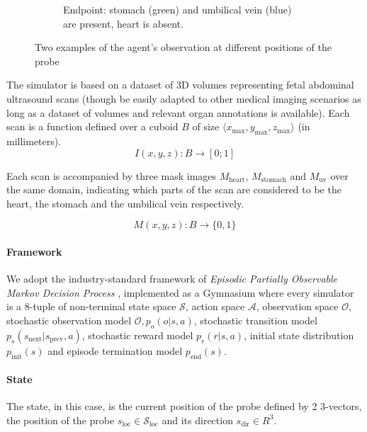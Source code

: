 \begin{figure}
\begin{subfigure}{.45\linewidth}
      \caption{Endpoint: stomach (green) and umbilical vein (blue) are present, heart is absent.}
      \label{fig:img-after}
    \end{subfigure}
    \caption{Two examples of the agent's observation at different positions of the probe}
    \label{fig:imgs}
\end{figure}

The simulator is based on a dataset of 3D volumes representing fetal abdominal ultrasound scans (though be easily adapted to other medical imaging scenarios as long as a dataset of volumes and relevant organ annotations is available).
Each scan is a function defined over a cuboid $B$ of size $\langle x_\text{max},y_\text{max},z_\text{max} \rangle$ (in millimeters).
\begin{equation}
    I(x,y,z): B \rightarrow [0;1]
\end{equation}

Each scan is accompanied by three mask images $M_\text{heart}$, $M_\text{stomach}$ and $M_\text{uv}$ over the same domain, indicating which parts of the scan are considered to be the heart, the stomach and the umbilical vein respectively.

\begin{equation}
    M(x,y,z): B \rightarrow \{0,1\}
\end{equation}

\paragraph{Framework}

We adopt the industry-standard framework of {\em Episodic Partially Observable Markov Decision Process} \cite{kramerjdavidrPartiallyObservableMarkov1964, spaanPartiallyObservableMarkov2012}, implemented as a Gymnasium \cite{towersGymnasiumStandardInterface2024} where every simulator is a 8-tuple of non-terminal state space $\mathcal{S}$, action space $\mathcal{A}$, observation space $\mathcal{O}$, stochastic observation model $\mathcal{O}, p_o(o | s, a)$, stochastic transition model $p_s(s_\text{next} | s_\text{prev}, a)$, stochastic reward model $p_r(r | s, a)$, initial state distribution $p_\text{init}(s)$ and episode termination model $p_\text{end}(s)$.

\paragraph{State}

The state, in this case, is the current position of the probe defined by 2 3-vectors, the position of the probe $s_\text{loc} \in \mathcal{S}_\text{loc}$ and its direction $s_\text{dir} \in R^{3}$.

